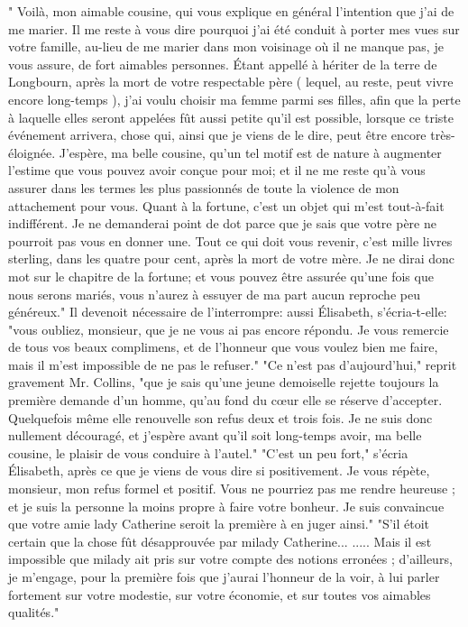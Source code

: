 " Voilà, mon aimable cousine, qui vous explique en général l'intention que j'ai de me marier. Il me reste à vous dire pourquoi j'ai été conduit à porter mes vues sur votre famille, au-lieu de me marier dans mon voisinage où il ne manque pas, je vous assure, de fort aimables personnes. Étant appellé à hériter de la terre de Longbourn, après la mort de votre respectable père ( lequel, au reste, peut vivre encore long-temps ), j'ai voulu choisir ma femme parmi ses filles, afin que\setcounter{page}{409} la perte à laquelle elles seront appelées fût aussi petite qu'il est possible, lorsque ce triste événement arrivera, chose qui, ainsi que je viens de le dire, peut être encore très-éloignée. J'espère, ma belle cousine, qu'un tel motif est de nature à augmenter l'estime que vous pouvez avoir conçue pour moi; et il ne me reste qu'à vous assurer dans les termes les plus passionnés de toute la violence de mon attachement pour vous. Quant à la fortune, c'est un objet qui m'est tout-à-fait indifférent. Je ne demanderai point de dot parce que je sais que votre père ne pourroit pas vous en donner une. Tout ce qui doit vous revenir, c'est mille livres sterling, dans les quatre pour cent, après la mort de votre mère. Je ne dirai donc mot sur le chapitre de la fortune; et vous pouvez être assurée qu'une fois que nous serons mariés, vous n'aurez à essuyer de ma part aucun reproche peu généreux."
Il devenoit nécessaire de l'interrompre: aussi Élisabeth, s'écria-t-elle: "vous oubliez, monsieur, que je ne vous ai pas encore répondu. Je vous remercie de tous vos beaux complimens, et de l'honneur que vous voulez bien me faire, mais il m'est impossible de ne pas le refuser."
\setcounter{page}{410}
"Ce n'est pas d'aujourd'hui," reprit gravement Mr. Collins, "que je sais qu'une jeune demoiselle rejette toujours la première demande d'un homme, qu'au fond du cœur elle se réserve d'accepter. Quelquefois même elle renouvelle son refus deux et trois fois. Je ne suis donc nullement découragé, et j'espère avant qu'il soit long-temps avoir, ma belle cousine, le plaisir de vous conduire à l'autel."
"C'est un peu fort," s'écria Élisabeth, après ce que je viens de vous dire si positivement. Je vous répète, monsieur, mon refus formel et positif. Vous ne pourriez pas me rendre heureuse ; et je suis la personne la moins propre à faire votre bonheur. Je suis convaincue que votre amie lady Catherine seroit la première à en juger ainsi."
"S'il étoit certain que la chose fût désapprouvée par milady Catherine... ..... Mais il est impossible que milady ait pris sur votre compte des notions erronées ; d'ailleurs, je m'engage, pour la première fois que j'aurai l'honneur de la voir, à lui parler fortement sur votre modestie, sur votre économie, et sur toutes vos aimables qualités."
